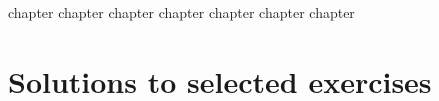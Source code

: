 {chapter}
{chapter}
{chapter}
{chapter}
{chapter}
{chapter}
{chapter}


\chapter{Solutions to selected exercises}
\printsolutions
